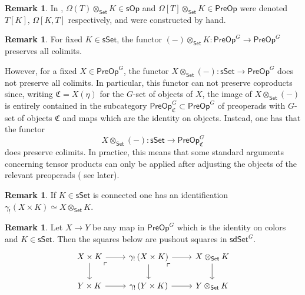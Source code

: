 \documentclass[a4paper,10pt
,draft
]{article}%
\numberwithin{equation}{section}
\numberwithin{figure}{section}
\theoremstyle{definition} %
\newtheorem{remark}[equation]{Remark}%
\newcommand{\sOp}{\ensuremath{\mathsf{sOp}}}%
\newcommand{\1}{\ensuremath{\mathbbm 1}}%
\begin{document}
\begin{remark}
	In \cite[\S 71.]{CM13b}, $\Omega(T) \otimes_{\mathsf{Set}} K \in \sOp$ and $\Omega[T] \otimes_{\mathsf{Set}} K \in \mathsf{PreOp}$ were denoted $T[K]$, $\Omega[K,T]$ respectively, and were constructed by hand.
\end{remark}


\begin{remark}
	For fixed $K \in \mathsf{sSet}$, the functor
	$(-) \otimes_{\mathsf{Set}} K
	\colon \mathsf{PreOp}^G \to \mathsf{PreOp}^G$
	preserves all colimits. 
	
	However, for a fixed $X \in \mathsf{PreOp}^G$,
	the functor 
	$X \otimes_{\mathsf{Set}} (-)
	\colon \mathsf{sSet} \to \mathsf{PreOp}^G$
	does not preserve all colimits.
	In particular, this functor can not preserve coproducts since, writing 
	$\mathfrak{C} = X(\eta)$ for the $G$-set of objects of $X$,
	the image of $X \otimes_{\mathsf{Set}} (-)$ is entirely contained in the subcategory
	$\mathsf{PreOp}^{G}_{\mathfrak{C}} \subset
	\mathsf{PreOp}^G$
	of preoperads with $G$-set of objects $\mathfrak{C}$ and maps which are the identity on objects. 
	Instead, one has that the functor 
\[
	X \otimes_{\mathsf{Set}} (-) \colon
	\mathsf{sSet} \to \mathsf{PreOp}^{G}_{\mathfrak{C}}
\]
	does preserve colimits. 
	In practice, this means that some standard arguments concerning tensor products can only be applied after adjusting the objects of the relevant preoperads
	({\color{red} see later}).
\end{remark}


\begin{remark}\label{OTIMCON REM}
	If $K \in \mathsf{sSet}$ is connected one has an identification
	$\gamma_! \left(X \times K\right) \simeq 
	X \otimes_{\mathsf{Set}} K$.
\end{remark}



\begin{remark}\label{COLORTENSGAM REM}
	Let $X \to Y$ be any map in $\mathsf{PreOp}^G$
	which is the identity on colors and 
	$K \in \mathsf{sSet}$. Then the squares below are pushout squares in $\mathsf{sdSet}^G$.
	\[
	\begin{tikzcd}
	X \times K \ar{r} \ar{d} 
	\arrow[dr, phantom, "\ulcorner", very near start] &
	\gamma_! \left( X \times K \right) \ar{r} \ar{d} 
	\arrow[dr, phantom, "\ulcorner", very near start] &
	X \otimes_{\mathsf{Set}} K \ar{d}
	\\
	Y \times K \ar{r} &
	\gamma_! \left( Y \times K \right) \ar{r} &
	Y \otimes_{\mathsf{Set}} K
	\end{tikzcd}
	\]
\end{remark}
\end{document}
